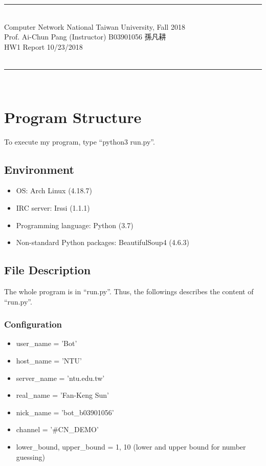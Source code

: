 \documentclass{article}
\begin{document}
{\bf \noindent
\rule[3pt]{\textwidth}{0.3pt}\\
Computer Network \hfill National Taiwan University, Fall 2018 \\
Prof. Ai-Chun Pang (Instructor) \hfill B03901056 孫凡耕 \\
HW1 Report \hfill 10/23/2018 \\
\vspace{-20pt} \\
\rule[3pt]{\textwidth}{1.3pt}\\
[-1cm]
}


\section{Program Structure}

To execute my program, type ``python3 run.py''.

\subsection{Environment}
\begin{itemize}
  \item OS: Arch Linux (4.18.7)
  \item IRC server: Irssi (1.1.1)
  \item Programming language: Python (3.7)
  \item Non-standard Python packages: BeautifulSoup4 (4.6.3)
\end{itemize}

\subsection{File Description}
The whole program is in ``run.py''.
Thus, the followings describes the content of ``run.py''.

\subsubsection{Configuration}
\begin{itemize}
  \item user\_name = 'Bot'
  \item host\_name = 'NTU'
  \item server\_name = 'ntu.edu.tw'
  \item real\_name = 'Fan-Keng Sun'
  \item nick\_name = 'bot\_b03901056'
  \item channel = '\#CN\_DEMO'
  \item lower\_bound, upper\_bound = 1, 10 (lower and upper bound for number guessing)
\end{itemize}
\end{document}
